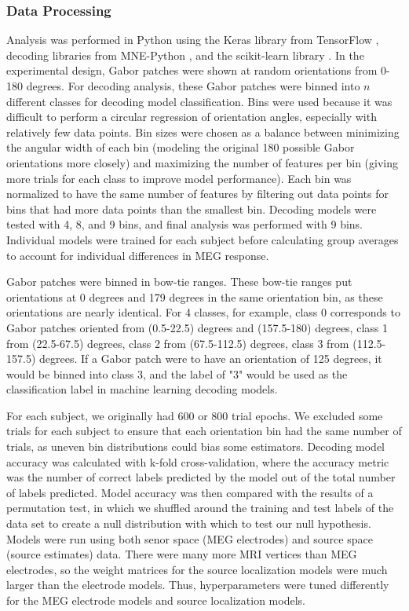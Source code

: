 \documentclass[../main.tex]{subfiles}
\begin{document}
\subsubsection{Data Processing}
Analysis was performed in Python using the Keras \citep{chollet2015keras} library from TensorFlow \citep{tensorflow2015-whitepaper}, decoding libraries from MNE-Python \citep{mne}, and the scikit-learn library \citep{scikit-learn}. In the experimental design, Gabor patches were shown at random orientations from 0-180 degrees. For decoding analysis, these Gabor patches were binned into $n$ different classes for decoding model classification. Bins were used because it was difficult to perform a circular regression of orientation angles, especially with relatively few data points. Bin sizes were chosen as a balance between minimizing the angular width of each bin (modeling the original 180 possible Gabor orientations more closely) and maximizing the number of features per bin (giving more trials for each class to improve model performance). Each bin was normalized to have the same number of features by filtering out data points for bins that had more data points than the smallest bin. Decoding models were tested with 4, 8, and 9 bins, and final analysis was performed with 9 bins. Individual models were trained for each subject before calculating group averages to account for individual differences in MEG response.

Gabor patches were binned in bow-tie ranges. These bow-tie ranges put orientations at 0 degrees and 179 degrees in the same orientation bin, as these orientations are nearly identical. For 4 classes, for example, class 0 corresponds to Gabor patches oriented from (0.5-22.5) degrees and (157.5-180) degrees, class 1 from (22.5-67.5) degrees, class 2 from (67.5-112.5) degrees, class 3 from (112.5-157.5) degrees. If a Gabor patch were to have an orientation of 125 degrees, it would be binned into class 3, and the label of "3" would be used as the classification label in machine learning decoding models. 

For each subject, we originally had 600 or 800 trial epochs. We excluded some trials for each subject to ensure that each orientation bin had the same number of trials, as uneven bin distributions could bias some estimators. Decoding model accuracy was calculated with k-fold cross-validation, where the accuracy metric was the number of correct labels predicted by the model out of the total number of labels predicted. Model accuracy was then compared with the results of a permutation test, in which we shuffled around the training and test labels of the data set to create a null distribution with which to test our null hypothesis. Models were run using both senor space (MEG electrodes) and source space (source estimates) data. There were many more MRI vertices than MEG electrodes, so the weight matrices for the source localization models were much larger than the electrode models. Thus, hyperparameters were tuned differently for the MEG electrode models and source localization models.
\end{document}
